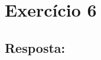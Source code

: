 \documentclass{article}
\begin{document}
\newpage

\section*{Exercício 6}

\bigskip

\subsection*{Resposta:}
\end{document}
